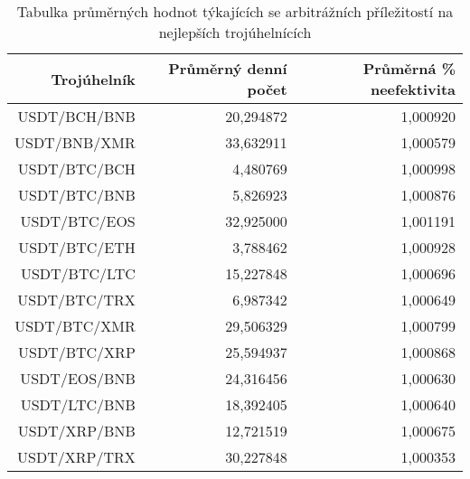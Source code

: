 \begin{table}\centering
\caption{Tabulka průměrných hodnot týkajících se arbitrážních příležitostí na nejlepších trojúhelnících}
\label{table_averages_best}
\begin{tabular}{|| r | r | r ||}\hline Trojúhelník & Průměrný denní počet & Průměrná \% neefektivita\\ [0.5ex]
 \hline\hline USDT/BCH/BNB & 20,294872 & 1,000920\\ 
 \hline USDT/BNB/XMR & 33,632911 & 1,000579\\ 
 \hline USDT/BTC/BCH & 4,480769 & 1,000998\\ 
 \hline USDT/BTC/BNB & 5,826923 & 1,000876\\ 
 \hline USDT/BTC/EOS & 32,925000 & 1,001191\\ 
 \hline USDT/BTC/ETH & 3,788462 & 1,000928\\ 
 \hline USDT/BTC/LTC & 15,227848 & 1,000696\\ 
 \hline USDT/BTC/TRX & 6,987342 & 1,000649\\ 
 \hline USDT/BTC/XMR & 29,506329 & 1,000799\\ 
 \hline USDT/BTC/XRP & 25,594937 & 1,000868\\ 
 \hline USDT/EOS/BNB & 24,316456 & 1,000630\\ 
 \hline USDT/LTC/BNB & 18,392405 & 1,000640\\ 
 \hline USDT/XRP/BNB & 12,721519 & 1,000675\\ 
 \hline USDT/XRP/TRX & 30,227848 & 1,000353\\ 
 \hline
\end{tabular}
\end{table}